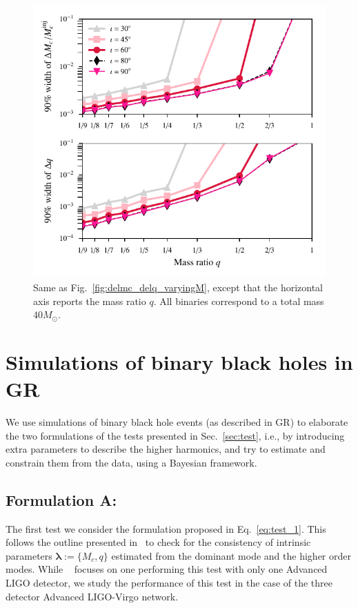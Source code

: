 \documentclass[prd,preprintnumbers,twocolumn,eqsecnum,floatfix,a4paper,nofootinbib,superscriptaddress]{revtex4}
\newcommand{\blambda}{\bm{\lambda}}
\begin{document}
 \begin{figure}[tbh]
 	\begin{center}
 		\includegraphics[scale=0.8]{figs/hm_9dim_dmcbymcinj_dq_diff_q.pdf}
 	\end{center} 
 	\caption{Same as Fig.~\ref{fig:delmc_delq_varyingM}, except that the horizontal axis reports the mass ratio $q$. All binaries correspond to a total mass $40M_{\odot}$.}
 	\label{fig:delmc_delq_varyingq}
 \end{figure}

\section{Simulations of binary black holes in GR}
\label{sec:simulations}

We use simulations of binary black hole events (as described in GR) to elaborate the two formulations of the tests presented in Sec.~\ref{sec:test}, i.e., by introducing extra parameters to describe the higher harmonics, and try to estimate and constrain them from the data, using a Bayesian framework.

\subsection{Formulation A:}
\label{sec:formulationA}
The first test we consider the formulation proposed in Eq.~\eqref{eq:test_1}. This follows the outline presented in~\cite{Dhanpal:2018ufk} to check for the consistency of intrinsic parameters $\blambda := \{M_c, q\}$ estimated from the dominant mode and the higher order modes. While ~\cite{Dhanpal:2018ufk} focuses on one performing this test with only one Advanced LIGO detector, we study the performance of this test in the case of the three detector Advanced LIGO-Virgo network. 
\end{document}
